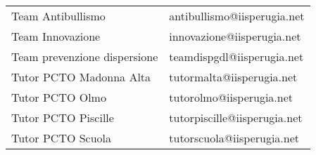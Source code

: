 \begin{center}
\begin{tabular}{ll}
Team Antibullismo &
antibullismo@iisperugia.net\\
Team Innovazione&
innovazione@iisperugia.net\\
Team prevenzione dispersione&
teamdispgdl@iisperugia.net\\
Tutor PCTO Madonna Alta&
tutormalta@iisperugia.net\\
Tutor PCTO Olmo&
tutorolmo@iisperugia.net\\
Tutor PCTO Piscille &
tutorpiscille@iisperugia.net\\
Tutor PCTO Scuola&
tutorscuola@iisperugia.net\\
\midrule
\end{tabular}
\end{center}


